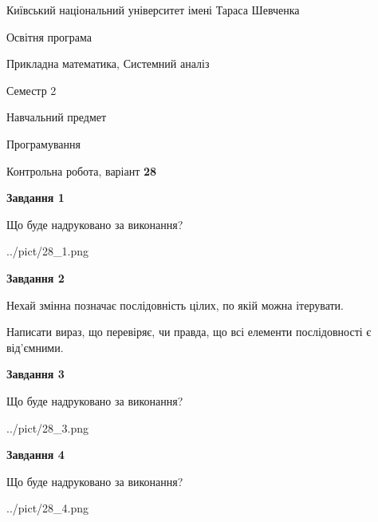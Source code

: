 \documentclass[12pt, ukrainian]{article}
\begin{document}
{{\begin {small}\par
{ \center  Київський національний університет імені Тараса Шевченка \par}
{\parbox {5 cm}{Освітня програма \hfill}{\parbox {8 cm}{Прикладна математика, Системний аналіз \hfill}}\parbox {5 cm}{\hfill Семестр 2}}\par
{\parbox {5 cm} {Навчальний предмет \hfill}\parbox {7 cm}{Програмування \hfill}\parbox {6cm}{\hfill}\par}\vspace{-7pt} \end{small}}{\center Контрольна робота, варіант  \No \textbf
{ 28 }\par}}
{
\begin {large}
{\begin {center}\textbf{Завдання 1}\end {center}}\par
Що буде надруковано за виконання?\par\par
\begin{center}
	{../pict/28_1.png}
\end{center}
\newpage

{\begin {center}\textbf{Завдання 2}\end {center}}\par
Нехай змінна  позначає послідовність цілих, по якій можна ітерувати.

Написати вираз, що перевіряє, чи правда, що всі елементи послідовності є від’ємни\-ми.\par
\newpage

{\begin {center}\textbf{Завдання 3}\end {center}}\par
Що буде надруковано за виконання?
\begin{center}
	{../pict/28_3.png}
\end{center}
\newpage

{\begin {center}\textbf{Завдання 4}\end {center}}\par
Що буде надруковано за виконання?\par
\begin{center}
	{../pict/28_4.png}
\end{center}
\newpage


\end{large}}
\end{document}
